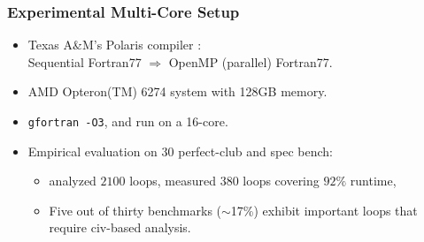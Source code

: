 \documentclass{beamer}
\newcommand{\emp}[1]{\textcolor{DikuRed}{ #1}}
\begin{document}
\begin{frame}[fragile,t]
  \frametitle{Experimental Multi-Core Setup} \vspace{-1ex}
\bigskip

\begin{itemize}
    \item Texas A\&M's Polaris compiler $:$\\ Sequential Fortran77 $\Rightarrow$ 
            OpenMP (parallel) Fortran77.\medskip

    \item AMD Opteron(TM) 6274 system with 128GB memory.\medskip

    \item {\tt gfortran -O3}, and run on a 16-core.\medskip

    \item Empirical evaluation on $30$ {\sc perfect-club} and 
            {\sc spec} bench:\smallskip
            \begin{itemize}
                \item analyzed $2100$ loops, measured $380$ 
                        loops covering $92\%$ runtime,\smallskip
                \item \emp{Five out of thirty benchmarks ($\sim$17\%)
                        exhibit important loops that require 
                        {\sc civ}-based analysis.}
            \end{itemize}
\end{itemize}
\end{frame}
\end{document}
